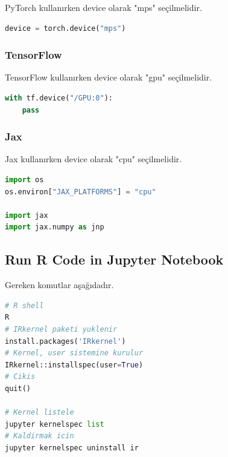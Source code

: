 PyTorch kullanırken device olarak "mps" seçilmelidir.

\begin{lstlisting}[language=Python]
device = torch.device("mps")
\end{lstlisting}

\subsubsection{TensorFlow}

TensorFlow kullanırken device olarak "gpu" seçilmelidir.

\begin{lstlisting}[language=Python]
with tf.device("/GPU:0"):
    pass
\end{lstlisting}

\subsubsection{Jax}

Jax kullanırken device olarak "cpu" seçilmelidir.

\begin{lstlisting}[language=Python]
import os
os.environ["JAX_PLATFORMS"] = "cpu"

import jax
import jax.numpy as jnp
\end{lstlisting}

\subsection{Run R Code in Jupyter Notebook}

Gereken komutlar aşağıdadır.

\begin{lstlisting}[language=Python]
# R shell
R
# IRkernel paketi yuklenir
install.packages('IRkernel')
# Kernel, user sistemine kurulur
IRkernel::installspec(user=True)
# Cikis
quit()

# Kernel listele
jupyter kernelspec list
# Kaldirmak icin
jupyter kernelspec uninstall ir
\end{lstlisting}

\newpage